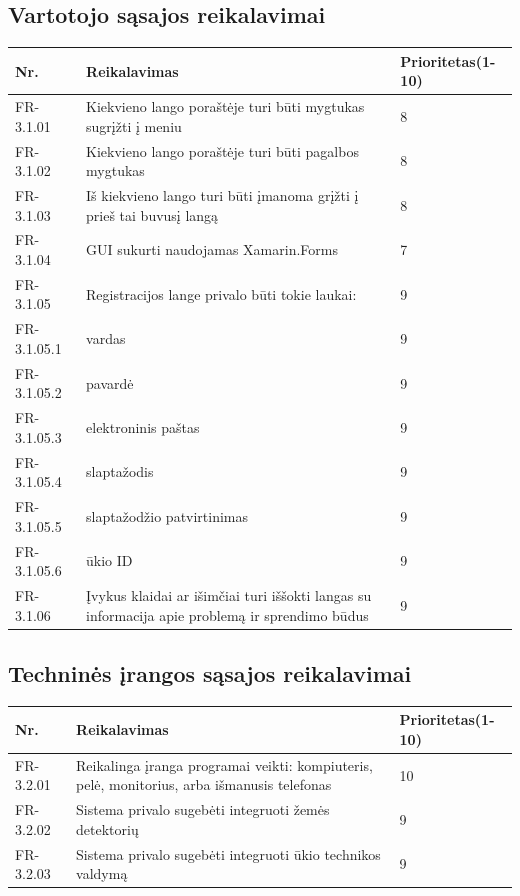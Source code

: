 \documentclass[oneside]{VUMIFPSkursinis}
\begin{document}
\subsection{Vartotojo sąsajos reikalavimai}
\begin{table}[htbp]
	\begin{tabularx}{1\textwidth}{ |P{2.5cm}|X|P{3cm }| }  \hline
		Nr. & Reikalavimas & Prioritetas(1-10) \\ \hline
		FR-3.1.01 & Kiekvieno lango poraštėje turi būti mygtukas sugrįžti į meniu & 8 \\ \hline
		FR-3.1.02 & Kiekvieno lango poraštėje turi būti pagalbos mygtukas & 8 \\ \hline
		FR-3.1.03 & Iš kiekvieno lango turi būti įmanoma grįžti į prieš tai buvusį langą & 8 \\ \hline
		FR-3.1.04 & GUI sukurti naudojamas Xamarin.Forms & 7 \\ \hline
		FR-3.1.05 & Registracijos lange privalo būti tokie laukai: & 9 \\ \hline
FR-3.1.05.1 & vardas & 9 \\ \hline
FR-3.1.05.2 & pavardė & 9 \\ \hline
FR-3.1.05.3 & elektroninis paštas & 9 \\ \hline
FR-3.1.05.4 & slaptažodis & 9 \\ \hline
FR-3.1.05.5 & slaptažodžio patvirtinimas & 9 \\ \hline
FR-3.1.05.6 & ūkio ID & 9 \\ \hline
		FR-3.1.06 & Įvykus klaidai ar išimčiai turi iššokti langas su informacija apie problemą ir sprendimo būdus & 9 \\ \hline
	\end{tabularx}
\end{table}

\subsection{Techninės įrangos sąsajos reikalavimai}
\begin{table}[htbp]
	\begin{tabularx}{1\textwidth}{ |P{2.5cm}|X|P{3cm }| }  \hline
		Nr. & Reikalavimas & Prioritetas(1-10) \\ \hline
		FR-3.2.01 & Reikalinga įranga programai veikti: kompiuteris, pelė, monitorius, arba išmanusis telefonas & 10 \\ \hline
		FR-3.2.02 & Sistema privalo sugebėti integruoti žemės detektorių & 9 \\ \hline
		FR-3.2.03 & Sistema privalo sugebėti integruoti ūkio technikos valdymą & 9 \\ \hline
	\end{tabularx}
\end{table}
\end{document}
